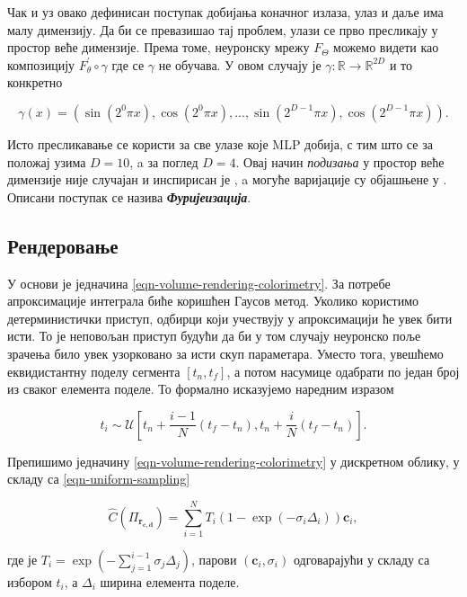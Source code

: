 \documentclass[12pt, a4paper, twoside]{book}
\numberwithin{equation}{chapter}
\numberwithin{theorem}{section}
\numberwithin{definition}{section}
\numberwithin{definitionChapter}{chapter}
\begin{document}
Чак и уз овако дефинисан поступак добијања коначног излаза, улаз и даље има малу димензију. Да би се превазишао
тај проблем, улази се прво пресликају у простор веће димензије. Према томе, неуронску мрежу $F_\Theta$ можемо
видети као композицију $F_\theta^\prime \circ \gamma$ где се $\gamma$ не обучава. У овом случају је
$\gamma : \mathbb{R} \rightarrow \mathbb{R}^{2D}$ и то конкретно

\begin{equation}
	\gamma(x) = (\sin(2^0\pi x), \cos(2^0 \pi x), ..., \sin(2^{D-1}\pi x), \cos(2^{D-1}\pi x)).
	\label{eqn-fourier-features}
\end{equation}

Исто пресликавање се користи за све улазе које MLP добија, с тим што се за положај узима $D=10$, a за поглед $D=4$.
Овај начин \textit{подизања} у простор веће димензије није случајан и инспирисан је \cite{transformer}, a могуће
варијације су објашњене у \cite{fourier-coefficients}. Описани поступак се назива \textbf{\textit{Фуријеизација}}.

\subsection{Рендеровање}
У основи је једначина \ref{eqn-volume-rendering-colorimetry}. За потребе апроксимације интеграла биће коришћен
Гаусов метод. Уколико користимо детерминистички приступ, одбирци који учествују у апроксимацији ће увек бити исти.
То је неповољан приступ будући да би у том случају неуронско поље зрачења било увек узорковано за исти скуп
параметара. Уместо тога, увешћемо еквидистантну поделу сегмента $\left[t_n, t_f\right]$, а потом насумице
одабрати по један број из сваког елемента поделе. То формално исказујемо наредним изразом

\begin{equation}
	t_i \sim \mathcal{U}\left[t_n + \frac{i - 1}{N}(t_f - t_n), t_n + \frac{i}{N}(t_f -t_n)\right].
	\label{eqn-uniform-sampling}
\end{equation}

Препишимо једначину \ref{eqn-volume-rendering-colorimetry} у дискретном облику, у складу са
\ref{eqn-uniform-sampling}

\begin{equation}
	\hat{C}(\Pi_{\mathbf{r_{c, d}}}) = \sum_{i=1}^{N} T_i (1- \exp(-\sigma_i\Delta_i)) \mathbf{c}_i,
	\label{eqn-discrete-rendering}
\end{equation}

где је $T_i = \exp\left(-\sum_{j=1}^{i-1}\sigma_j\Delta_j\right)$, парови $(\mathbf{c}_i, \sigma_i)$
одговарајући у складу са избором $t_i$, а $\Delta_i$ ширина елемента поделе.
\end{document}
